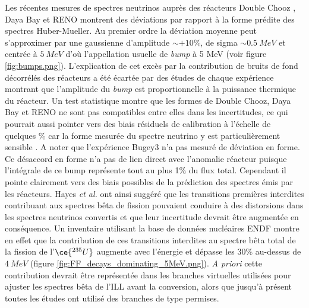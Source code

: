 Les récentes mesures de spectres neutrinos auprès des réacteurs Double Chooz \cite{Abe:2014bwa}, Daya Bay \cite{An:2016srz} et RENO \cite{Seo:2016uom} montrent des déviations par rapport à la forme prédite des spectres Huber-Mueller. Au premier ordre la déviation moyenne peut s'approximer par une gaussienne d'amplitude $\sim +10\%$, de sigma $\sim \SI{0.5}{MeV}$ et centrée à $\SI{5}{MeV}$ d'où l'appellation usuelle de \og \textit{bump} à 5 MeV \fg{} (voir figure \ref{fig:bumps.png}). L’explication de cet excès par la contribution de bruits de fond décorrélés des réacteurs a été écartée par des études de chaque expérience montrant que l’amplitude du \textit{bump} est proportionnelle à la puissance thermique du réacteur. Un test statistique montre que les formes de Double Chooz, Daya Bay et RENO ne sont pas compatibles entre elles dans les incertitudes, ce qui pourrait aussi pointer vers des biais résiduels de calibration à l'échelle de quelques \% car la forme mesurée du spectre neutrino y est particulièrement sensible \cite{Mention:2017dyq}. A noter que l'expérience Bugey3 n'a pas mesuré de déviation en forme.\\

Ce désaccord en forme n’a pas de lien direct avec l’anomalie réacteur puisque l'intégrale de ce bump représente tout au plus 1\% du flux total. Cependant il pointe clairement vers des biais possibles de la prédiction des spectres émis par les réacteurs. Hayes \textit{et al.} \cite{Hayes:2013wra} ont ainsi suggéré que les transitions premières interdites contribuant aux spectres bêta de fission pouvaient conduire à des distorsions dans les spectres neutrinos convertis et que leur incertitude devrait être augmentée en conséquence. Un inventaire utilisant la base de données nucléaires ENDF montre en effet que la contribution de ces transitions interdites au spectre bêta total de la fission de l'$\ce{^{235}U}$ augmente avec l'énergie et dépasse les 30\% au-dessus de $\SI{4}{MeV}$ (figure \ref{fig:FF_decays_dominating_5MeV.png}). \textit{A priori} cette contribution devrait être représentée dans les branches virtuelles utilisées pour ajuster les spectres bêta de l'ILL avant la conversion, alors que jusqu'à présent toutes les études ont utilisé des branches de type permises.\\

